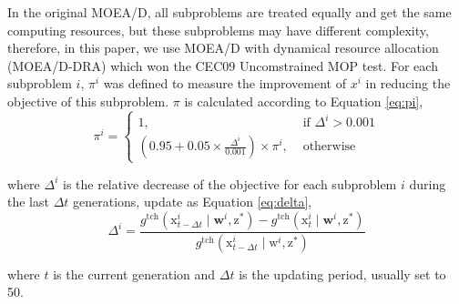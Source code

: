 \documentclass[journal]{IEEEtran}
\begin{document}
In the original MOEA/D, all subproblems are treated equally and get the same computing resources,
but these subproblems may have different complexity, therefore, in this paper, we use MOEA/D with dynamical resource allocation (MOEA/D-DRA) \cite{moead-dra} which won the CEC09 Uncomstrained MOP test.
For each subproblem $i$, $\pi^i$ was defined to measure the improvement of $x^i$ in reducing the objective of this subproblem. $\pi$ is calculated according to Equation \ref{eq:pi},
\begin{equation}
  \pi^{i}=\left\{\begin{array}{ll}
    1,                                                                     & \text { if } \Delta^{i}>0.001 \\
    \left(0.95+0.05 \times \frac{\Delta^{i}}{0.001}\right) \times \pi^{i}, & \text { otherwise }
  \end{array}\right.
  \label{eq:pi}
\end{equation}

where $\Delta^i$ is the relative decrease of the objective for each subproblem $i$ during the last $\Delta t$ generations, update as Equation \ref{eq:delta},
\begin{equation}
  \Delta^{i}=\frac{g^{\mathrm{tch}}\left(\mathrm{x}_{t-\Delta t}^{i} \mid \mathbf{w}^{i}, \mathrm{z}^{*}\right)-g^{\mathrm{tch}}\left(\mathrm{x}_{t}^{i} \mid \mathbf{w}^{i}, \mathrm{z}^{*}\right)}{g^{\mathrm{tch}}\left(\mathrm{x}_{t-\Delta t}^{i} \mid \mathrm{w}^{i}, \mathrm{z}^{*}\right)}
  \label{eq:delta}
\end{equation}

where $t$ is the current generation and $\Delta t$ is the updating period, usually set to 50.
\end{document}
